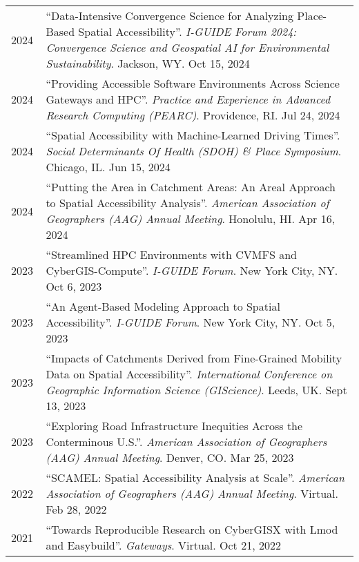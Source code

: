 \documentclass{acmcv}
\begin{document}
    \begin{longtable}{p{0.1\linewidth} p{0.9\linewidth}}
        2024 & ``Data-Intensive Convergence Science for Analyzing Place-Based Spatial Accessibility''. \textit{I-GUIDE Forum 2024: Convergence Science and Geospatial AI for Environmental Sustainability}. Jackson, WY. Oct 15, 2024\\

        2024 & ``Providing Accessible Software Environments Across Science Gateways and HPC''. \textit{Practice and Experience in Advanced Research Computing (PEARC)}. Providence, RI. Jul 24, 2024\\

        2024 & ``Spatial Accessibility with Machine-Learned Driving Times''. \textit{Social Determinants Of Health (SDOH) \& Place Symposium}. Chicago, IL. Jun 15, 2024\\

        2024 & ``Putting the Area in Catchment Areas: An Areal Approach to Spatial Accessibility Analysis''. \textit{American Association of Geographers (AAG) Annual Meeting}. Honolulu, HI. Apr 16, 2024\\

        2023 & ``Streamlined HPC Environments with CVMFS and CyberGIS-Compute''. \textit{I-GUIDE Forum}. New York City, NY. Oct 6, 2023\\

        2023 & ``An Agent-Based Modeling Approach to Spatial Accessibility''. \textit{I-GUIDE Forum}. New York City, NY. Oct 5, 2023\\

        2023 & ``Impacts of Catchments Derived from Fine-Grained Mobility Data on Spatial Accessibility''. \textit{International Conference on Geographic Information Science (GIScience)}. Leeds, UK. Sept 13, 2023\\

        2023 & ``Exploring Road Infrastructure Inequities Across the Conterminous U.S.''. \textit{American Association of Geographers (AAG) Annual Meeting}. Denver, CO. Mar 25, 2023\\

        2022 & ``SCAMEL: Spatial Accessibility Analysis at Scale''. \textit{American Association of Geographers (AAG) Annual Meeting}. Virtual. Feb 28, 2022\\

        2021 & ``Towards Reproducible Research on CyberGISX with Lmod and Easybuild''. \textit{Gateways}. Virtual. Oct 21, 2022\\


\end{longtable}
\end{document}
